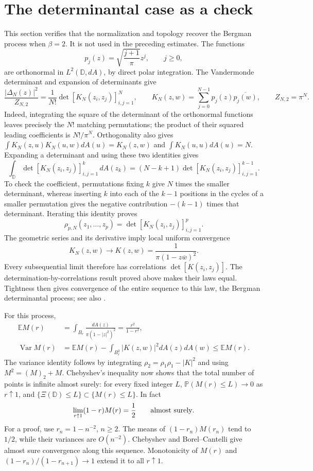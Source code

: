 \documentclass[11pt,a4paper]{article}
\numberwithin{equation}{section}
\theoremstyle{definition}
\theoremstyle{remark}
\newcommand{\D}{\mathbb D}
\newcommand{\E}{\mathbb E}
\newcommand{\Pbb}{\mathbb P}
\DeclareMathOperator{\Var}{Var}
\begin{document}
\section{The determinantal case as a check}\label{sec:beta-two}
This section verifies that the normalization and topology recover the
Bergman process when $\beta=2$. It is not used in the preceding estimates.
The functions
\[
 p_j(z)=\sqrt{\frac{j+1}{\pi}}z^j,\qquad j\ge0,
\]
are orthonormal in $L^2(\D,dA)$, by direct polar integration. The
Vandermonde determinant and expansion of determinants give
\[
 \frac{|\Delta_N(z)|^2}{Z_{N,2}}
 =\frac1{N!}\det[K_N(z_i,z_j)]_{i,j=1}^N,
 \qquad K_N(z,w)=\sum_{j=0}^{N-1}p_j(z)\overline{p_j(w)},
 \qquad Z_{N,2}=\pi^N.
\]
Indeed, integrating the square of the determinant of the orthonormal
functions leaves precisely the $N!$ matching permutations; the product
of their squared leading coefficients is $N!/\pi^N$.
Orthogonality also gives $\int K_N(z,u)K_N(u,w)dA(u)=K_N(z,w)$ and
$\int K_N(u,u)dA(u)=N$. Expanding a determinant and using these two
identities gives
\[
 \int_{\D}\det[K_N(z_i,z_j)]_{i,j=1}^k\,dA(z_k)
 =(N-k+1)\det[K_N(z_i,z_j)]_{i,j=1}^{k-1}.
\]
To check the coefficient, permutations fixing $k$ give $N$ times the
smaller determinant, whereas inserting $k$ into each of the $k-1$
positions in the cycles of a smaller permutation gives the negative
contribution $-(k-1)$ times that determinant. Iterating this identity
proves
\[
 \rho_{p,N}(z_1,\ldots,z_p)=\det[K_N(z_i,z_j)]_{i,j=1}^p.
\]
The geometric series and its derivative imply local uniform convergence
\[
 K_N(z,w)\longrightarrow
 K(z,w)=\frac{1}{\pi(1-z\overline w)^2}.
\]
Every subsequential limit therefore has correlations $\det[K(z_i,z_j)]$.
The determination-by-correlations result proved above makes their laws
equal. Tightness then gives convergence of the entire sequence to this
law, the Bergman determinantal process; see also \cite{PV,BGZNW}.

For this process,
\begin{align*}
 \E M(r)&=\int_{B_r}\frac{dA(z)}{\pi(1-|z|^2)^2}
 =\frac{r^2}{1-r^2},\\
 \Var M(r)&=\E M(r)-\int_{B_r^2}|K(z,w)|^2dA(z)dA(w)
 \le\E M(r).
\end{align*}
The variance identity follows by integrating $\rho_2=\rho_1\rho_1-|K|^2$
and using $M^2=(M)_2+M$. Chebyshev's inequality now shows that the total
number of points is infinite almost surely: for every fixed integer $L$,
$\Pbb(M(r)\le L)\to0$ as $r\uparrow1$, and
$\{\Xi(\D)\le L\}\subset\{M(r)\le L\}$.
In fact
\[
 \lim_{r\uparrow1}(1-r)M(r)=\frac12\qquad\hbox{almost surely}.
\]
For a proof, use $r_n=1-n^{-2}$, $n\ge2$. The means of
$(1-r_n)M(r_n)$ tend to $1/2$, while their variances are $O(n^{-2})$.
Chebyshev and Borel--Cantelli give almost sure convergence along this
sequence. Monotonicity of $M(r)$ and
$(1-r_n)/(1-r_{n+1})\to1$ extend it to all $r\uparrow1$.
\end{document}
